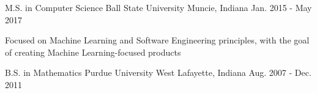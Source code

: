 

\begin{cventries}

  \cventry
    {M.S. in Computer Science} %
    {Ball State University} %
    {Muncie, Indiana} %
    {Jan. 2015 - May 2017} %
    {
      \begin{cvitems} %
        \item {Focused on Machine Learning and Software Engineering principles, with the goal of creating Machine Learning-focused products}
      \end{cvitems}
    }
  \cventry
    {B.S. in Mathematics}
    {Purdue University}
    {West Lafayette, Indiana}
    {Aug. 2007 - Dec. 2011}
    {}

\end{cventries}
